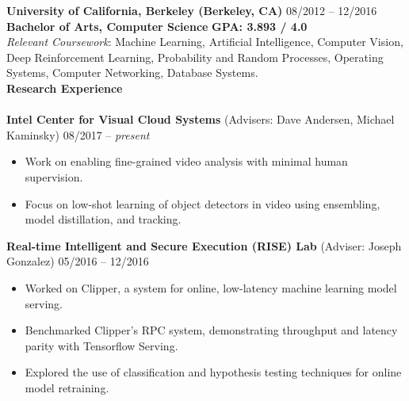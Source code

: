 \documentclass{article}
\begin{document}
\noindent
\textbf{University of California, Berkeley (Berkeley, CA)}
\hfill 08/2012 -- 12/2016 \\
\indent
\textbf{Bachelor of Arts, Computer Science}  
\hfill{\textbf{GPA: 3.893 / 4.0}}\\
\textit{Relevant Coursework}: Machine Learning, Artificial Intelligence, Computer Vision, Deep Reinforcement Learning, Probability and Random Processes, Operating Systems, Computer Networking, Database Systems.
\\

\noindent
\textbf{{\Large Research Experience}}\\[-2mm]
\HRule\\
\noindent
\textbf{Intel Center for Visual Cloud Systems} (Advisers: Dave Andersen, Michael Kaminsky)
\hfill 08/2017 -- \textit{present}
\begin{itemize}
\vspace{-2.5mm}
\item Work on enabling fine-grained video analysis with minimal human supervision.
\vspace{-2.5mm}
\item Focus on low-shot learning of object detectors in video using ensembling, model distillation, and tracking.
\end{itemize}
\vspace{-2mm}
\indent

\noindent
\textbf{Real-time Intelligent and Secure Execution (RISE) Lab} (Adviser: Joseph Gonzalez)
\hfill 05/2016 -- 12/2016
\begin{itemize}
\vspace{-2.5mm}
\item Worked on Clipper, a system for online, low-latency machine learning model serving.
\vspace{-2.5mm}
\item Benchmarked Clipper's RPC system, demonstrating throughput and latency parity with Tensorflow Serving.
\vspace{-2.5mm}
\item Explored the use of classification and hypothesis testing techniques for online model retraining.
\end{itemize}
\vspace{-2mm}
\end{document}
